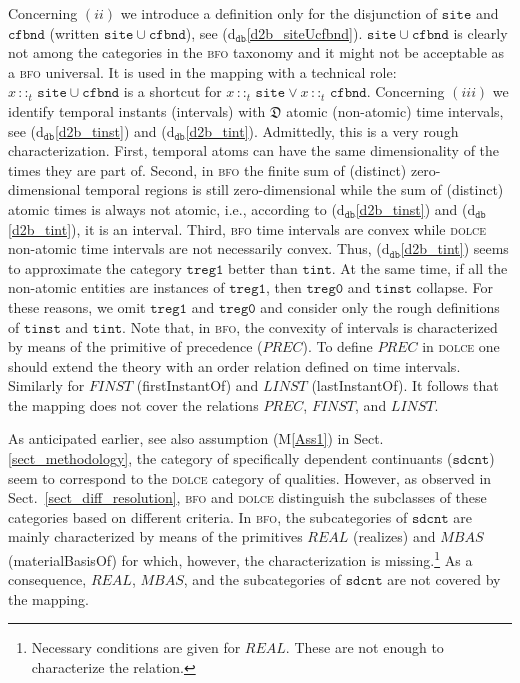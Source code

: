 \documentclass[ao]{iosart2x}
\newcommand{\nb}[1]{\textcolor{red}{$|$}\marginpar{\hspace*{-0cm}\parbox{20mm}{\scriptsize\raggedright\textcolor{red}{#1}}}}
\newcommand{\dbDefLabel}{\textrm{d$_\texttt{db}$}}
\newcommand{\refdbdf}[1]{({\dbDefLabel}\ref{#1})}
\newcommand{\prbfo}[1]{{\textit{{#1}}}}
\newcommand{\cn}[1]{\mathtt{#1}}
\newcommand{\dolce}{{\textsc{dolce}}}
\newcommand{\bfo}{{\textsc{bfo}}}
\newcommand {\thdolce} {\ensuremath{\mathfrak{D}}}
\newcommand{\sdcntbcat}{\cn{sdcnt}}
\newcommand{\sitebcat}{\cn{site}}
\newcommand{\cfbndbcat}{\cn{cfbnd}}
\newcommand{\tinstbcat}{\cn{tinst}}
\newcommand{\tintbcat}{\cn{tint}}
\newcommand{\onetregbcat}{\cn{treg1}}
\newcommand{\zerotregbcat}{\cn{treg0}}
\newcommand{\bfoiof}[1]{{\,::_{#1\:\!}}}
\newcommand{\bforealizes}{\prbfo{REAL}}
\begin{document}
Concerning $(ii)$ we introduce a definition only for the disjunction of $\sitebcat$ and $\cfbndbcat$ (written $\sitebcat{\cup}\cfbndbcat$), see \refdbdf{d2b_siteUcfbnd}. $\sitebcat{\cup}\cfbndbcat$ is clearly not among the categories in the {\bfo} taxonomy and it might not be acceptable as a {\bfo} universal. It is used in the mapping with a technical role: $x \bfoiof{t} \sitebcat{\cup}\cfbndbcat$ is a shortcut for $x \bfoiof{t} \sitebcat \lor x \bfoiof{t}\cfbndbcat$. %
Concerning $(iii)$ we identify temporal instants (intervals) with $\thdolce$ atomic (non-atomic) time intervals, see \refdbdf{d2b_tinst} and \refdbdf{d2b_tint}. Admittedly, this is a very rough characterization. First, temporal atoms can have the same dimensionality of the times they are part of. Second, in {\bfo} the finite sum of (distinct) zero-dimensional temporal regions is still zero-dimensional while the sum of (distinct) atomic times is always not atomic, i.e., according to \refdbdf{d2b_tinst} and \refdbdf{d2b_tint}, {it is} an interval. Third, {\bfo} time intervals are convex while {\dolce} non-atomic time intervals are not necessarily convex. Thus, \refdbdf{d2b_tint} seems to approximate the category $\onetregbcat$ better than $\tintbcat$. At the same time, if all the non-atomic entities are instances of  $\onetregbcat$, then $\zerotregbcat$ and $\tinstbcat$ collapse. For these reasons, we omit $\onetregbcat$ and $\zerotregbcat$ and 
consider only the rough definitions of $\tinstbcat$ and $\tintbcat$. Note that, in {\bfo}, the convexity of intervals is characterized by means of the primitive of precedence ($\prbfo{PREC}$). To define $\prbfo{PREC}$ in {\dolce} one should extend the theory with an order relation defined on time intervals. Similarly for $\prbfo{FINST}$ (firstInstantOf) and $\prbfo{LINST}$ (lastInstantOf). It follows that the mapping does not cover the relations $\prbfo{PREC}$, $\prbfo{FINST}$, and $\prbfo{LINST}$.

As anticipated earlier, see also assumption (M\ref{Ass1}) in Sect. \ref{sect_methodology}, the category of specifically dependent continuants ($\sdcntbcat$) seem to correspond to the {\dolce} category of qualities. However, as observed in Sect.~\ref{sect_diff_resolution}, {\bfo} and {\dolce} distinguish the subclasses of these categories based on different criteria. In {\bfo}, the subcategories of $\sdcntbcat$ are mainly characterized by means of the primitives $\bforealizes$ (realizes) and $\prbfo{MBAS}$ (materialBasisOf) for which, however, the characterization is missing.\footnote{Necessary conditions are given for $\bforealizes$. These are not enough to characterize the relation.} As a consequence, $\bforealizes$, $\prbfo{MBAS}$, and the subcategories of $\sdcntbcat$ are not covered by the mapping.
\end{document}
